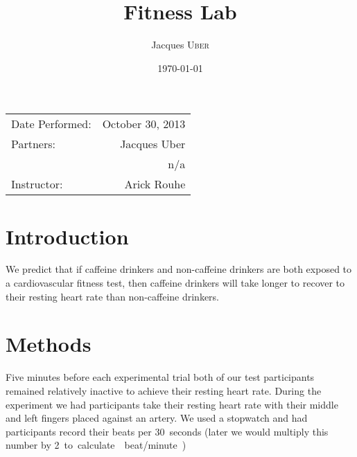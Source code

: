 \documentclass{article}
\title{Fitness Lab} %
\author{Jacques \textsc{Uber}} %
\date{\today} %
\begin{document}
\maketitle %

\begin{center}
\begin{tabular}{l r}
Date Performed: & October 30, 2013 \\ %
Partners: & Jacques Uber \\ %
& n/a \\
Instructor: & Arick Rouhe %
\end{tabular}
\end{center}


\section{Introduction}

We predict that if caffeine drinkers and non-caffeine drinkers are both exposed to a cardiovascular
fitness test, then caffeine drinkers will take longer to recover to their resting heart rate than
non-caffeine drinkers. \\

\section{Methods}
\label{sec:methods}
Five minutes before each experimental trial both of our test participants remained relatively inactive
to achieve their resting heart rate. During the experiment we had participants take their resting
heart rate with their middle and left fingers placed against an artery. We used a stopwatch and had
participants record their beats per \SI{30}{seconds} (later we would multiply this number by \SI{2}
to calculate \SI{}{beat/minute}.) \\
\end{document}
